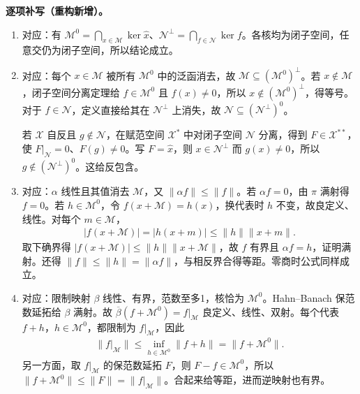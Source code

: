 \documentclass[../../main.tex]{subfiles}
\begin{document}
\begin{solution}
\textbf{逐项补写（重构新增）。}
\begin{enumerate}
\item 对应：有 $\mathcal M^0=\bigcap_{x\in\mathcal M}\ker\widehat x$、$\mathcal N^\perp=\bigcap_{f\in\mathcal N}\ker f$。各核均为闭子空间，任意交仍为闭子空间，所以结论成立。
\item 对应：每个 $x\in\mathcal M$ 被所有 $\mathcal M^0$ 中的泛函消去，故 $\mathcal M\subseteq(\mathcal M^0)^\perp$。若 $x\notin\mathcal M$，闭子空间分离定理给 $f\in\mathcal M^0$ 且 $f(x)\ne0$，所以 $x\notin(\mathcal M^0)^\perp$，得等号。对于 $f\in\mathcal N$，定义直接给其在 $\mathcal N^\perp$ 上消失，故 $\mathcal N\subseteq(\mathcal N^\perp)^0$。

若 $\mathcal X$ 自反且 $g\notin\mathcal N$，在赋范空间 $\mathcal X^*$ 中对闭子空间 $\mathcal N$ 分离，得到 $F\in\mathcal X^{**}$，使 $F|_{\mathcal N}=0$、$F(g)\ne0$。写 $F=\widehat x$，则 $x\in\mathcal N^\perp$ 而 $g(x)\ne0$，所以 $g\notin(\mathcal N^\perp)^0$。这给反包含。
\item 对应：$\alpha$ 线性且其值消去 $\mathcal M$，又 $\|\alpha f\|\le\|f\|$。若 $\alpha f=0$，由 $\pi$ 满射得 $f=0$。若 $h\in\mathcal M^0$，令 $f(x+\mathcal M)=h(x)$，换代表时 $h$ 不变，故良定义、线性。对每个 $m\in\mathcal M$，
\begin{align*}
|f(x+\mathcal M)|=|h(x+m)|\le\|h\|\|x+m\|.
\end{align*}
取下确界得 $|f(x+\mathcal M)|\le\|h\|\|x+\mathcal M\|$，故 $f$ 有界且 $\alpha f=h$，证明满射。还得 $\|f\|\le\|h\|=\|\alpha f\|$，与相反界合得等距。零商时公式同样成立。
\item 对应：限制映射 $\beta$ 线性、有界，范数至多1，核恰为 $\mathcal M^0$。Hahn--Banach 保范数延拓给 $\beta$ 满射。故 $\overline\beta(f+\mathcal M^0)=f|_{\mathcal M}$ 良定义、线性、双射。每个代表 $f+h$，$h\in\mathcal M^0$，都限制为 $f|_{\mathcal M}$，因此
\begin{align*}
\|f|_{\mathcal M}\|\le\inf_{h\in\mathcal M^0}\|f+h\|=\|f+\mathcal M^0\|.
\end{align*}
另一方面，取 $f|_{\mathcal M}$ 的保范数延拓 $F$，则 $F-f\in\mathcal M^0$，所以 $\|f+\mathcal M^0\|\le\|F\|=\|f|_{\mathcal M}\|$。合起来给等距，进而逆映射也有界。
\end{enumerate}
\end{solution}
\end{document}
